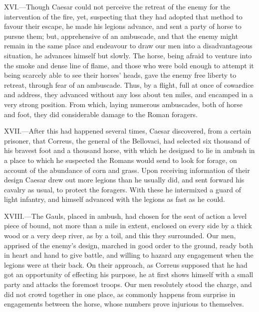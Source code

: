 XVI.—Though Caesar could not perceive the retreat of the enemy for the
intervention of the fire, yet, suspecting that they had adopted that
method to favour their escape, he made his legions advance, and sent a
party of horse to pursue them; but, apprehensive of an ambuscade, and
that the enemy might remain in the same place and endeavour to draw our
men into a disadvantageous situation, he advances himself but slowly.
The horse, being afraid to venture into the smoke and dense line of
flame, and those who were bold enough to attempt it being scarcely able
to see their horses' heads, gave the enemy free liberty to retreat,
through fear of an ambuscade. Thus, by a flight, full at once of
cowardice and address, they advanced without any loss about ten miles,
and encamped in a very strong position. From which, laying numerous
ambuscades, both of horse and foot, they did considerable damage to the
Roman foragers.

XVII.—After this had happened several times, Caesar discovered, from a
certain prisoner, that Correus, the general of the Bellovaci, had
selected six thousand of his bravest foot and a thousand horse, with
which he designed to lie in ambush in a place to which he suspected the
Romans would send to look for forage, on account of the abundance of
corn and grass. Upon receiving information of their design Caesar drew
out more legions than he usually did, and sent forward his cavalry as
usual, to protect the foragers. With these he intermixed a guard of
light infantry, and himself advanced with the legions as fast as he
could.

XVIII.—The Gauls, placed in ambush, had chosen for the seat of action a
level piece of bound, not more than a mile in extent, enclosed on every
side by a thick wood or a very deep river, as by a toil, and this they
surrounded. Our men, apprised of the enemy's design, marched in good
order to the ground, ready both in heart and hand to give battle, and
willing to hazard any engagement when the legions were at their back. On
their approach, as Correus supposed that he had got an opportunity of
effecting his purpose, he at first shows himself with a small party and
attacks the foremost troops. Our men resolutely stood the charge, and
did not crowd together in one place, as commonly happens from surprise
in engagements between the horse, whose numbers prove injurious to
themselves.

